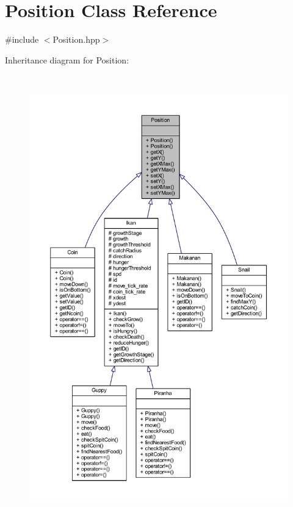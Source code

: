 \hypertarget{class_position}{}\section{Position Class Reference}
\label{class_position}


{\ttfamily \#include $<$Position.\+hpp$>$}



Inheritance diagram for Position\+:
\nopagebreak
\begin{figure}[H]
\begin{center}
\leavevmode
\includegraphics[height=550pt]{class_position__inherit__graph}
\end{center}
\end{figure}


